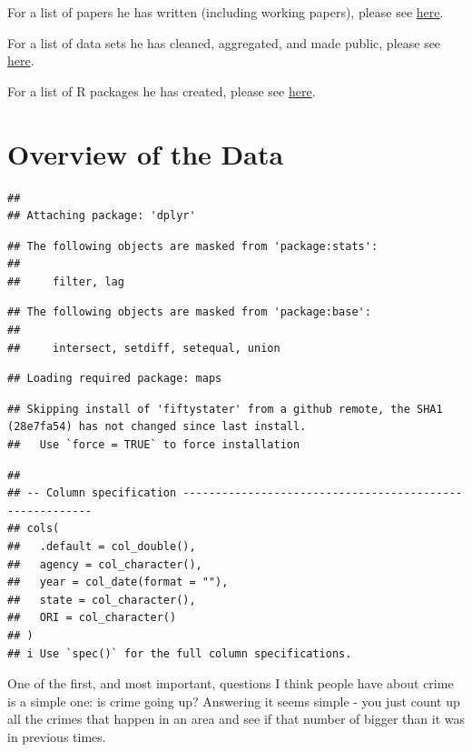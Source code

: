 \documentclass[
  12pt,
  openany]{book}
\begin{document}
For a list of papers he has written (including working papers), please see \href{http://jacobdkaplan.com/research.html}{here}.

For a list of data sets he has cleaned, aggregated, and made public, please see \href{http://jacobdkaplan.com/data.html}{here}.

For a list of R packages he has created, please see \href{https://jacobdkaplan.com/packages.html}{here}.

\hypertarget{ucr_general}{%
\chapter{Overview of the Data}\label{ucr_general}}

\begin{verbatim}
## 
## Attaching package: 'dplyr'
\end{verbatim}

\begin{verbatim}
## The following objects are masked from 'package:stats':
## 
##     filter, lag
\end{verbatim}

\begin{verbatim}
## The following objects are masked from 'package:base':
## 
##     intersect, setdiff, setequal, union
\end{verbatim}

\begin{verbatim}
## Loading required package: maps
\end{verbatim}

\begin{verbatim}
## Skipping install of 'fiftystater' from a github remote, the SHA1 (28e7fa54) has not changed since last install.
##   Use `force = TRUE` to force installation
\end{verbatim}

\begin{verbatim}
## 
## -- Column specification --------------------------------------------------------
## cols(
##   .default = col_double(),
##   agency = col_character(),
##   year = col_date(format = ""),
##   state = col_character(),
##   ORI = col_character()
## )
## i Use `spec()` for the full column specifications.
\end{verbatim}

One of the first, and most important, questions I think people have about crime is a simple one: is crime going up? Answering it seems simple - you just count up all the crimes that happen in an area and see if that number of bigger than it was in previous times.
\end{document}
